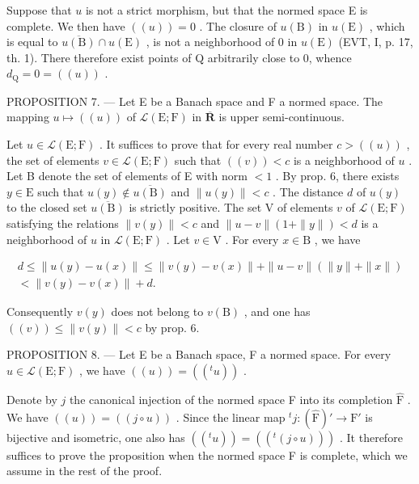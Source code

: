 Suppose that \(u\) is not a strict morphism, but that the normed space E is complete. We then have \(((u)) = 0\) . The closure of \(u(\mathrm{B})\) in \(u(\mathrm{E})\) , which is equal to \(\overline{u(\mathrm{B})} \cap u(\mathrm{E})\) , is not a neighborhood of 0 in \(u(\mathrm{E})\) (EVT, I, p. 17, th. 1). There therefore exist points of Q arbitrarily close to 0, whence \(d_{\mathrm{Q}} = 0 = ((u))\) .

PROPOSITION 7. --- Let E be a Banach space and F a normed space. The mapping \(u \mapsto ((u))\) of \(\mathcal{L}(\mathrm{E};\mathrm{F})\) in \(\overline{\mathbf{R}}\) is upper semi-continuous.

Let \(u \in \mathcal{L}(\mathrm{E};\mathrm{F})\) . It suffices to prove that for every real number \(c > ((u))\) , the set of elements \(v \in \mathcal{L}(\mathrm{E};\mathrm{F})\) such that \(((v)) < c\) is a neighborhood of \(u\) . Let B denote the set of elements of E with norm \(< 1\) . By prop. 6, there exists \(y \in \mathrm{E}\) such that \(u(y) \notin \overline{u(\mathrm{B})}\) and \(\| u(y)\| < c\) . The distance \(d\) of \(u(y)\) to the closed set \(\overline{u(\mathrm{B})}\) is strictly positive. The set V of elements \(v\) of \(\mathcal{L}(\mathrm{E};\mathrm{F})\) satisfying the relations \(\| v(y)\| < c\) and \(\| u - v\|(1 + \| y\|) < d\) is a neighborhood of \(u\) in \(\mathcal{L}(\mathrm{E};\mathrm{F})\) . Let \(v \in \mathrm{V}\) . For every \(x \in \mathrm{B}\) , we have

\[
\begin{array}{c} d \leqslant \| u (y) - u (x) \| \leqslant \| v (y) - v (x) \| + \| u - v \| (\| y \| + \| x \|) \\ <   \| v (y) - v (x) \| + d. \end{array}
\]

Consequently \(v(y)\) does not belong to \(v(\mathrm{B})\) , and one has \(((v)) \leqslant \| v(y) \| < c\) by prop. 6.

PROPOSITION 8. --- Let E be a Banach space, F a normed space. For every \(u \in \mathcal{L}(\mathrm{E};\mathrm{F})\) , we have \(((u)) = ((^t u))\) .

Denote by \(j\) the canonical injection of the normed space F into its completion \(\widehat{\mathrm{F}}\) . We have \(((u)) = ((j \circ u))\) . Since the linear map \(^t j: (\widehat{\mathrm{F}})' \to \mathrm{F}'\) is bijective and isometric, one also has \(((^t u)) = ((^t (j \circ u)))\) . It therefore suffices to prove the proposition when the normed space F is complete, which we assume in the rest of the proof.

